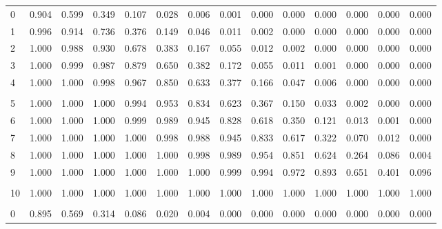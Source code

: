 \documentclass[
]{article}
\begin{document}
\begin{longtable}[t]{lrrrrrrrrrrrrr}
\hspace{1em}0 & 0.904 & 0.599 & 0.349 & 0.107 & 0.028 & 0.006 & 0.001 & 0.000 & 0.000 & 0.000 & 0.000 & 0.000 & 0.000\\
\hspace{1em}1 & 0.996 & 0.914 & 0.736 & 0.376 & 0.149 & 0.046 & 0.011 & 0.002 & 0.000 & 0.000 & 0.000 & 0.000 & 0.000\\
\hspace{1em}2 & 1.000 & 0.988 & 0.930 & 0.678 & 0.383 & 0.167 & 0.055 & 0.012 & 0.002 & 0.000 & 0.000 & 0.000 & 0.000\\
\hspace{1em}3 & 1.000 & 0.999 & 0.987 & 0.879 & 0.650 & 0.382 & 0.172 & 0.055 & 0.011 & 0.001 & 0.000 & 0.000 & 0.000\\
\hspace{1em}4 & 1.000 & 1.000 & 0.998 & 0.967 & 0.850 & 0.633 & 0.377 & 0.166 & 0.047 & 0.006 & 0.000 & 0.000 & 0.000\\
\addlinespace[-.7em]
\multicolumn{14}{l}{ }\\
\hspace{1em}5 & 1.000 & 1.000 & 1.000 & 0.994 & 0.953 & 0.834 & 0.623 & 0.367 & 0.150 & 0.033 & 0.002 & 0.000 & 0.000\\
\hspace{1em}6 & 1.000 & 1.000 & 1.000 & 0.999 & 0.989 & 0.945 & 0.828 & 0.618 & 0.350 & 0.121 & 0.013 & 0.001 & 0.000\\
\hspace{1em}7 & 1.000 & 1.000 & 1.000 & 1.000 & 0.998 & 0.988 & 0.945 & 0.833 & 0.617 & 0.322 & 0.070 & 0.012 & 0.000\\
\hspace{1em}8 & 1.000 & 1.000 & 1.000 & 1.000 & 1.000 & 0.998 & 0.989 & 0.954 & 0.851 & 0.624 & 0.264 & 0.086 & 0.004\\
\hspace{1em}9 & 1.000 & 1.000 & 1.000 & 1.000 & 1.000 & 1.000 & 0.999 & 0.994 & 0.972 & 0.893 & 0.651 & 0.401 & 0.096\\
\addlinespace[-.7em]
\multicolumn{14}{l}{ }\\
\hspace{1em}10 & 1.000 & 1.000 & 1.000 & 1.000 & 1.000 & 1.000 & 1.000 & 1.000 & 1.000 & 1.000 & 1.000 & 1.000 & 1.000\\
\addlinespace[0.3em]
\multicolumn{14}{l}{$n=11$}\\
\hspace{1em}0 & 0.895 & 0.569 & 0.314 & 0.086 & 0.020 & 0.004 & 0.000 & 0.000 & 0.000 & 0.000 & 0.000 & 0.000 & 0.000\\

\end{longtable}
\end{document}

